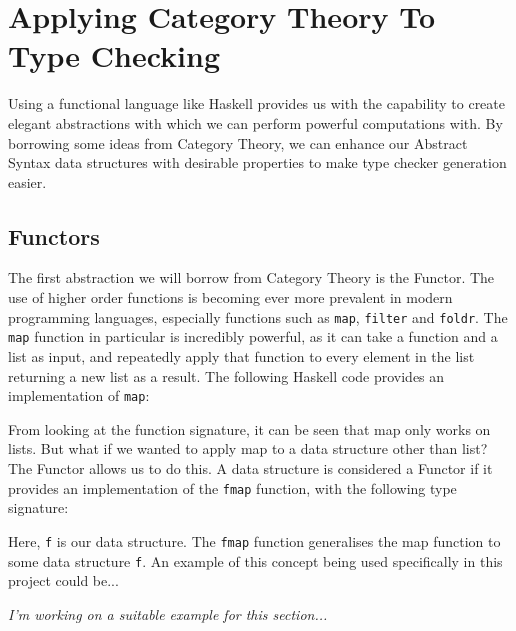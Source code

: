 \documentclass{UoYCSproject}
\begin{document}
\section{Applying Category Theory To Type Checking}
\label{sec:CategoryTheory}
Using a functional language like Haskell provides us with the capability to
create elegant abstractions with which we can perform powerful computations
with. By borrowing some ideas from Category Theory, we can enhance our Abstract
Syntax data structures with desirable properties to make type checker generation
easier.

\subsection{Functors}
The first abstraction we will borrow from Category Theory is the Functor. The
use of higher order functions is becoming ever more prevalent in modern
programming languages, especially functions such as \lstinline{map},
\lstinline{filter} and \lstinline{foldr}. The \lstinline{map} function in
particular is incredibly powerful, as it can take a function and a list as
input, and repeatedly apply that function to every element in the list returning
a new list as a result. The following Haskell code provides an implementation
of \lstinline{map}:

From looking at the function signature, it can be seen that map only works on
lists. But what if we wanted to apply map to a data structure other than list?
The Functor allows us to do this. A data structure is considered a Functor if
it provides an implementation of the \lstinline{fmap} function, with the
following type signature:

Here, \lstinline{f} is our data structure. The \lstinline{fmap} function
generalises the map function to some data structure \lstinline{f}. An example
of this concept being used specifically in this project could be...

\textit{I'm working on a suitable example for this section...}
\end{document}
